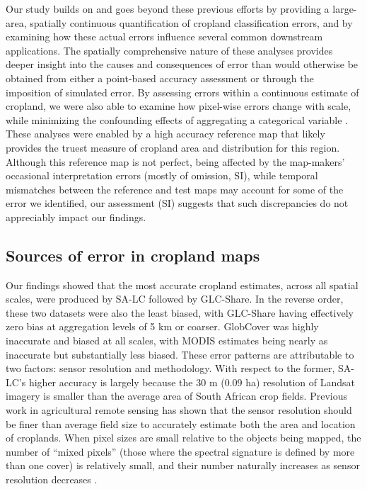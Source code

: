 \documentclass[12 pt, titlepage, a4paper]{article}
\begin{document}
Our study builds on and goes beyond these previous efforts by providing a large-area, spatially continuous quantification of cropland classification errors, and by examining how these actual errors influence several common downstream applications. The spatially comprehensive nature of these analyses provides deeper insight into the causes and consequences of error than would otherwise be obtained from either a point-based accuracy assessment or through the imposition of simulated error. By assessing errors within a continuous estimate of cropland, we were also able to examine how pixel-wise errors change with scale, while minimizing the confounding effects of aggregating a categorical variable \citep[][and see discussion in subsequent Recommendations section]{moody_influence_1995, marceau_remote_1999}. These analyses were enabled by a high accuracy reference map that likely provides the truest measure of cropland area and distribution for this region. Although this reference map is not perfect, being affected by the map-makers' occasional interpretation errors (mostly of omission, SI), while temporal mismatches between the reference and test maps may account for some of the error we identified, our assessment (SI) suggests that such discrepancies do not appreciably impact our findings. 

\vspace{-0.3 cm} 
\subsection*{Sources of error in cropland maps}
\vspace{-0.2 cm}
Our findings showed that the most accurate cropland estimates, across all spatial scales, were produced by SA-LC followed by GLC-Share. In the reverse order, these two datasets were also the least biased, with GLC-Share having effectively zero bias at aggregation levels of 5 km or coarser.  GlobCover was highly inaccurate and biased at all scales, with MODIS estimates being nearly as inaccurate but substantially less biased. These error patterns are attributable to two factors: sensor resolution and methodology. With respect to the former, SA-LC's higher accuracy is largely because the 30 m (0.09 ha) resolution of Landsat imagery is smaller than the average area of South African crop fields. Previous work in agricultural remote sensing has shown that the sensor resolution should be finer than average field size to accurately estimate both the area and location of croplands\citep{ozdogan_resolution_2006,pax-lenney_effect_1997}. When pixel sizes are small relative to the objects being mapped, the number of ``mixed pixels'' (those where the spectral signature is defined by more than one cover) is relatively small, and their number naturally increases as sensor resolution decreases \citep{ozdogan_resolution_2006}. 
\end{document}
